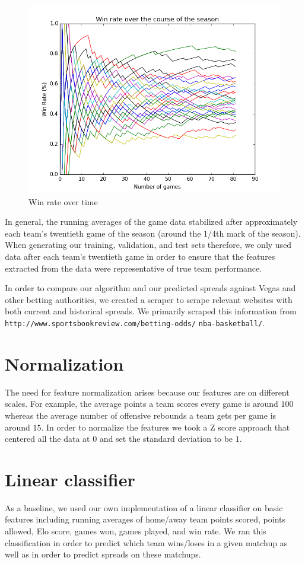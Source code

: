\documentclass{article}
\begin{document}
\begin{figure}[width=\linewidth]
\centering
  \includegraphics[width=0.8\linewidth]{code/figures/win_rate.png}
\caption{Win rate over time}
\end{figure}

In general, the running averages of the game data stabilized after approximately each team's twentieth game of the season (around the 1/4th mark of the season). When generating our training, validation, and test sets therefore, we only used data after each team's twentieth game in order to ensure that the features extracted from the data were representative of true team performance.

In order to compare our algorithm and our predicted spreads against Vegas and other betting authorities, we created a scraper to scrape relevant websites with both current and historical spreads. We primarily scraped this information from \texttt{http://www.sportsbookreview.com/betting-odds/} \texttt{nba-basketball/}.

\section{Normalization}
The need for feature normalization arises because our features are on different scales. For example, the average points a team scores every game is around $100$ whereas the average number of offensive rebounds a team gets per game is around $15$. In order to normalize the features we took a Z score approach that centered all the data at $0$ and set the standard deviation to be $1$.

\section{Linear classifier}
As a baseline, we used our own implementation of a linear classifier on basic features including running averages of home/away team points scored, points allowed, Elo score, games won, games played, and win rate. We ran this classification in order to predict which team wins/loses in a given matchup as well as in order to predict spreads on these matchups.
\end{document}
